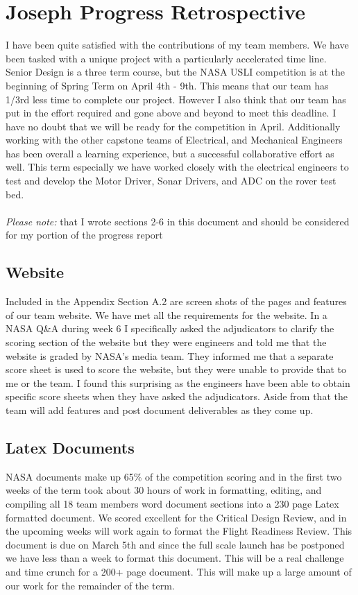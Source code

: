 \documentclass[onecolumn, draftclsnofoot,10pt, compsoc]{IEEEtran}
\begin{document}
\section{Joseph Progress Retrospective}
I have been quite satisfied with the contributions of my team members. We have been tasked with a unique project with a particularly accelerated time line. Senior Design is a three term course, but the NASA USLI competition is at the beginning of Spring Term on April 4th - 9th. This means that our team has 1/3rd less time to complete our project. However I also think that our team has put in the effort required and gone above and beyond to meet this deadline. I have no doubt that we will be ready for the competition in April. Additionally working with the other capstone teams of Electrical, and Mechanical Engineers has been overall a learning experience, but a successful collaborative effort as well. This term especially we have worked closely with the electrical engineers to test and develop the Motor Driver, Sonar Drivers, and ADC on the rover test bed. \\
\\
\textit{Please note:} that I wrote sections 2-6 in this document and should be considered for my portion of the progress report 
\subsection{Website}
Included in the Appendix Section A.2 are screen shots of the pages and features of our team website. We have met all the requirements for the website. In a NASA Q\&A during week 6 I specifically asked the adjudicators to clarify the scoring section of the website but they were engineers and told me that the website is graded by NASA's media team. They informed me that a separate score sheet is used to score the website, but they were unable to provide that to me or the team. I found this surprising as the engineers have been able to obtain specific score sheets when they have asked the adjudicators. Aside from that the team will add features and post document deliverables as they come up.

\subsection{Latex Documents}
NASA documents make up 65\% of the competition scoring and in the first two weeks of the term took about 30 hours of work in formatting, editing, and compiling all 18 team members word document sections into a 230 page Latex formatted document. We scored excellent for the Critical Design Review, and in the upcoming weeks will work again to format the Flight Readiness Review. This document is due on March 5th and since the full scale launch has be postponed we have less than a week to format this document. This will be a real challenge and time crunch for a 200+ page document. This will make up a large amount of our work for the remainder of the term.
\end{document}
